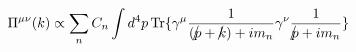 \begin{equation}
\Pi^{\mu\nu}(k) \propto \sum_n C_n \int d^4p \, {\rm
Tr}\{\gamma^\mu {1 \over
{({p\kern-0.15em\raise0.17ex\llap{/}\kern0.15em\relax} +
{k\kern-0.15em\raise0.17ex\llap{/}\kern0.15em\relax}) +i m_n }}
\gamma^\nu {1 \over {{p\kern-0.15em\raise0.17ex\llap{/}
\kern0.15em\relax} +i m_n}}\} \label{e2}
\end{equation}

